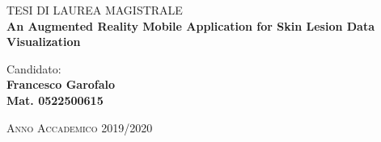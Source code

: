 \vspace{0.2cm}

%
%
\begin{center}
	{\LARGE{TESI DI LAUREA MAGISTRALE}}\\
	\vspace{1cm}
	{\LARGE \textbf{An Augmented Reality Mobile Application for Skin Lesion Data Visualization} \smallskip\\}                                               
\end{center}


\vspace{15mm}
\noindent
%
\begin{minipage}[t]{0.47\textwidth}

	
\end{minipage}
\hfill
\begin{minipage}[t]{0.4\textwidth}\raggedleft
	{\large{Candidato: \\ \bf Francesco Garofalo\\ Mat. 0522500615}}
\end{minipage}                                     					              

\vspace{1cm}
\begin{center}
	\textsc{Anno Accademico 2019/2020}
\end{center}

\newpage

